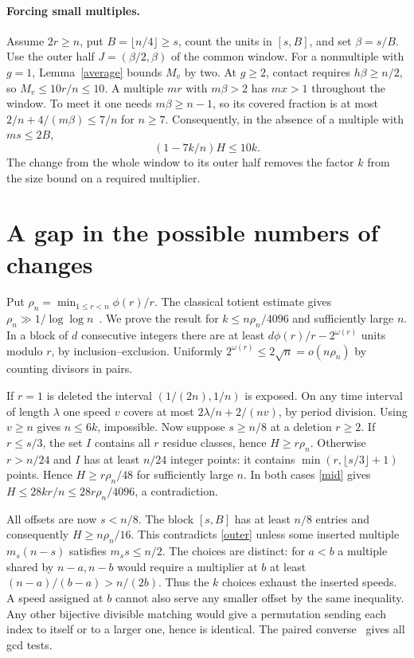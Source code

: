 \documentclass[11pt,a4paper]{article}
\begin{document}
\paragraph{Forcing small multiples.}
Assume $2r\ge n$, put $B=\lfloor n/4\rfloor\ge s$, count the units in $[s,B]$, and set $\beta=s/B$. Use the outer half $J=(\beta/2,\beta)$ of the common window. For a nonmultiple with $g=1$, Lemma~\ref{average} bounds $M_v$ by two. At $g\ge2$, contact requires $h\beta\ge n/2$, so $M_v\le10r/n\le10$. A multiple $mr$ with $m\beta>2$ has $mx>1$ throughout the window. To meet it one needs $m\beta\ge n-1$, so its covered fraction is at most $2/n+4/(m\beta)\le7/n$ for $n\ge7$. Consequently, in the absence of a multiple with $ms\le2B$,
\begin{equation}\label{outer}
 (1-7k/n)H\le10k .
\end{equation}
The change from the whole window to its outer half removes the factor $k$ from the size bound on a required multiplier.

\section{A gap in the possible numbers of changes}
Put $\rho_n=\min_{1\le r<n}\phi(r)/r$. The classical totient estimate gives $\rho_n\gg1/\log\log n$~\cite[Thm.~15]{RS}. We prove the result for $k\le n\rho_n/4096$ and sufficiently large $n$. In a block of $d$ consecutive integers there are at least $d\phi(r)/r-2^{\omega(r)}$ units modulo $r$, by inclusion--exclusion. Uniformly $2^{\omega(r)}\le 2\sqrt n=o(n\rho_n)$ by counting divisors in pairs.

If $r=1$ is deleted the interval $(1/(2n),1/n)$ is exposed. On any time interval of length $\lambda$ one speed $v$ covers at most $2\lambda/n+2/(nv)$, by period division. Using $v\ge n$ gives $n\le6k$, impossible. Now suppose $s\ge n/8$ at a deletion $r\ge2$. If $r\le s/3$, the set $I$ contains all $r$ residue classes, hence $H\ge r\rho_n$. Otherwise $r>n/24$ and $I$ has at least $n/24$ integer points: it contains $\min(r,\lfloor s/3\rfloor+1)$ points. Hence $H\ge r\rho_n/48$ for sufficiently large $n$. In both cases \eqref{mid} gives $H\le28kr/n\le28r\rho_n/4096$, a contradiction.

All offsets are now $s<n/8$. The block $[s,B]$ has at least $n/8$ entries and consequently $H\ge n\rho_n/16$. This contradicts \eqref{outer} unless some inserted multiple $m_s(n-s)$ satisfies $m_s s\le n/2$. The choices are distinct: for $a<b$ a multiple shared by $n-a,n-b$ would require a multiplier at $b$ at least $(n-a)/(b-a)>n/(2b)$. Thus the $k$ choices exhaust the inserted speeds. A speed assigned at $b$ cannot also serve any smaller offset by the same inequality. Any other bijective divisible matching would give a permutation sending each index to itself or to a larger one, hence is identical. The paired converse~\cite[Thm.~1]{C} gives all gcd tests.
\end{document}
